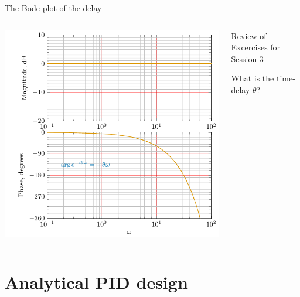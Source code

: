 \documentclass[presentation,aspectratio=169, usenames, dvipsnames]{beamer}
\begin{document}
\begin{frame}[label={sec:org3ad6758}]{The Bode-plot of the delay}
\begin{columns}
\begin{column}{0.7\columnwidth}
\begin{center}
  \includegraphics[width=.8\linewidth]{../../figures/bode-delay}
\end{center}
\end{column}

\begin{column}{0.6\columnwidth}
\pause

\alert{Review of Excercises for Session 3}

What is the time-delay \(\theta\)?
\end{column}
\end{columns}
\end{frame}

\section{Analytical PID design}
\label{sec:org90ed2bc}
\end{document}
